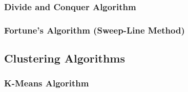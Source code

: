 \subsubsection{Divide and Conquer Algorithm}\label{tes:ssec:dac}
%
\subsubsection{Fortune's Algorithm (Sweep-Line Method)}\label{tes:ssec:fort}
\subsection{Clustering Algorithms} \label{tes:sec:clu}
%
\subsubsection{K-Means Algorithm}\label{tes:ssec:kma}
